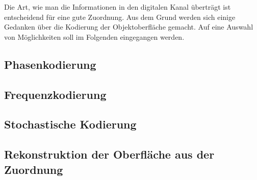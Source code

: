 \noindent
Die Art, wie man die Informationen in den digitalen Kanal überträgt ist entscheidend für eine gute Zuordnung.
Aus dem Grund werden sich einige Gedanken über die Kodierung der Objektoberfläche gemacht.
Auf eine Auswahl von Möglichkeiten soll im Folgenden eingegangen werden.
%
{
	\FloatBarrier
    \subsection{Phasenkodierung}
    \label{sub:phasenKodierung}
    
}
%
{
	\FloatBarrier
    \subsection{Frequenzkodierung}
    \label{sub:frequenzKodierung}
    
}
%
{
	\FloatBarrier
    \subsection{Stochastische Kodierung}
    \label{sub:stochastischeKodierung}
    
}
%
{
	\FloatBarrier
    \subsection{Rekonstruktion der Oberfläche aus der Zuordnung}
    \label{sub:rekonstruktionAusZuordnung}
    
}
%
